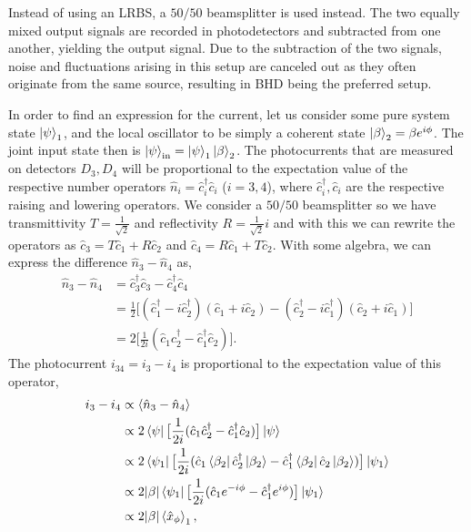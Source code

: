 Instead of using an LRBS, a $50/50$ beamsplitter is used instead. The two equally mixed output signals are recorded in photodetectors and subtracted from one another, yielding the output signal. Due to the subtraction of the two signals, noise and fluctuations arising in this setup are canceled out as they often originate from the same source, resulting in BHD being the preferred setup. 

In order to find an expression for the current, let us consider some pure system state $\ket{\psi}_1$, and the local oscillator to be simply a coherent state $\ket{\beta}_2 = \beta e^{i \phi}$. The joint input state then is $\ket{\psi}_\text{in} = \ket{\psi}_1 \ket{\beta}_2$. The photocurrents that are measured on detectors $D_3, D_4$ will be proportional to the expectation value of the respective number operators $\hat{n}_i = \hat{c}^\dagger_i \hat{c}_i$ ($i = 3,4$), where $\hat{c}^\dagger_i, \hat{c}_i$ are the respective raising and lowering operators. We consider a $50/50$ beamsplitter so we have transmittivity $T = \frac{1}{\sqrt{2}}$ and reflectivity $R = \frac{1}{\sqrt{2}}i$ and with this we can rewrite the operators as $\hat{c}_3 = T \hat{c}_1 + R \hat{c}_2$ and $\hat{c}_4 = R \hat{c}_1 + T \hat{c}_2$. 
With some algebra, we can express the difference $\hat{n}_3-\hat{n}_4$ as, 
\begin{align*}
    \hat{n}_3 - \hat{n}_4 &= \hat{c}^\dagger_3 \hat{c}_3 - \hat{c}^\dagger_4 \hat{c}_4   \\
    &= \frac{1}{2} \big[ (\hat{c}^\dagger_1 - i \hat{c}^\dagger_2)(\hat{c}_1 + i\hat{c}_2) - (\hat{c}^\dagger_2 - i \hat{c}^\dagger_1)(\hat{c}_2 + i \hat{c}_1) \big]\\
    &= 2 \big[\frac{1}{2i} (\hat{c}_1 \hat{c}^\dagger_2 - \hat{c}^\dagger_1 \hat{c}_2) \big]. 
\end{align*}
The photocurrent $i_{34} = i_3-i_4$ is proportional to the expectation value of this operator, 
\begin{align*}
    i_3-i_4 & \propto \expval{\hat{n}_3 - \hat{n}_4} \\
    & \propto 2 \bra{\psi} \big[\frac{1}{2i} (\hat{c}_1 \hat{c}^\dagger_2 - \hat{c}^\dagger_1 \hat{c}_2) \big] \ket{\psi} \\
    & \propto 2 \bra{\psi_1} \big[\frac{1}{2i} (\hat{c}_1 \bra{\beta_2}\hat{c}^\dagger_2\ket{\beta_2} - \hat{c}^\dagger_1 \bra{\beta_2}\hat{c}_2\ket{\beta_2}) \big] \ket{\psi_1} \\
    & \propto 2 |\beta| \bra{\psi_1} \big[\frac{1}{2i} (\hat{c}_1 e^{-i \phi} - \hat{c}^\dagger_1 e^{i \phi}) \big] \ket{\psi_1}\\
    & \propto 2 |\beta| \expval{\hat{x}_\phi}_1,
\end{align*}
